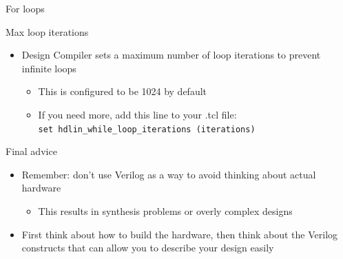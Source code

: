 \documentclass[table,dvipsnames]{beamer}
\begin{document}
\begin{frame}[fragile]{For loops}
	\begin{block}{Max loop iterations}
			\begin{itemize}
			 	\item Design Compiler sets a maximum number of loop iterations to prevent infinite loops
			 	\begin{itemize}
			 		\item This is configured to be 1024 by default
			 		\item If you need more, add this line to your .tcl file:
			 		\\\texttt{set hdlin\_while\_loop\_iterations (iterations)}
				\end{itemize}
			\end{itemize}
	\end{block}


	\begin{block}{Final advice}
		\begin{itemize}
			 \item Remember: don't use Verilog as a way to avoid thinking about actual hardware
			 \begin{itemize}
			 	\item This results in synthesis problems or overly complex designs
			\end{itemize}
			\item First think about how to build the hardware, then think about the Verilog constructs that can allow you to describe your design easily
			\end{itemize}
	\end{block}
\end{frame}
 
 
\end{document}
